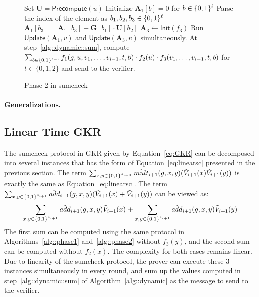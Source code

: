 \begin{figure}[b!]
	\begin{algorithm}[H]
		\caption{Phase 2 in sumcheck}\label{alg::phase2}
		\begin{algorithmic}[1]
			\State Set $\textbf{U} = \mathsf{Precompute}(u)$
			\State Initialize $\textbf{A}_1[b] = 0$ for $b\in\{0,1\}^\ell$
			\State Parse the index of the element as $b_1,b_2,b_3\in\{0,1\}^\ell$
			\State\label{alg::phase2::init} $\textbf{A}_1[b_3] = \textbf{A}_1[b_3]+ \textbf{G}[b_1]\cdot\textbf{U}[b_2]$
			\EndFor
			\EndProcedure
			\State $\textbf{A}_3\leftarrow\mathsf{Init}(f_3)$
			\State Run $\mathsf{Update}(\textbf{A}_1, v)$ and $\mathsf{Update}(\textbf{A}_3,v)$ simultaneously. At step~\ref{alg::dynamic::sum}, compute $\sum_{b\in\{0,1\}^{\ell-i}}f_1(g,u, v_1, \ldots,v_{i-1}, t, b)\cdot f_2(u)\cdot f_3(v_1, \ldots,v_{i-1}, t, b)$ for $t\in\{0,1,2\}$ and send to the verifier.
			\EndProcedure
		\end{algorithmic}
	\end{algorithm}
\end{figure}


\paragraph{Generalizations.}

\subsection{Linear Time GKR}

The sumcheck protocol in GKR given by Equation~\ref{eq:GKR} can be decomposed into several instances that has the form of Equation~\ref{eq:linearsc} presented in the previous section. The term $\sum_{x,y\in\{0,1\}^{s_{i+1}}}\tilde{mult}_{i+1}(g,x,y)(\tilde{V}_{i+1}(x)\tilde{V}_{i+1}(y))$ is exactly the same as Equation~\ref{eq:linearsc}.  The term $\sum_{x,y\in\{0,1\}^{s_{i+1}}}\tilde{add}_{i+1}(g,x,y)(\tilde{V}_{i+1}(x)+\tilde{V}_{i+1}(y))$ can be viewed as: 
\[
\sum_{x,y\in\{0,1\}^{s_{i+1}}}\tilde{add}_{i+1}(g,x,y)\tilde{V}_{i+1}(x)+\sum_{x,y\in\{0,1\}^{s_{i+1}}}\tilde{add}_{i+1}(g,x,y)\tilde{V}_{i+1}(y)
\]
The first sum can be computed using the same protocol in Algorithms~\ref{alg::phase1} and~\ref{alg::phase2} without $f_3(y)$, and the second sum can be computed without $f_2(x)$. The complexity for both cases remains linear. Due to linearity of the sumcheck protocol, the prover can execute these 3 instances simultaneously in every round, and sum up the values computed in step~\ref{alg::dynamic::sum} of Algorithm~\ref{alg::dynamic} as the message to send to the verifier.



